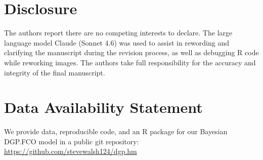\documentclass[11pt]{article}
\begin{document}
\section{Disclosure}
The authors report there are no competing interests to declare. The large language model 
Claude (Sonnet 4.6) was used to assist in rewording and clarifying the manuscript 
during the revision process, as well as debugging R code while reworking images. 
The authors take full responsibility for the accuracy and integrity of the final manuscript.

\section{Data Availability Statement}
We provide data, reproducible code, and an {\sf R} package for our 
Bayesian DGP.FCO model in a public git repository: \url{https://github.com/stevewalsh124/dgp.hm}

\appendix
\renewcommand{\thesection}{Appendix \Alph{section}}
\end{document}
